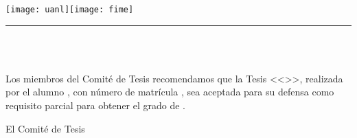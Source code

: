 {\renewcommand{\baselinestretch}{1.1}\selectfont
\begin{center}\vspace*{-25mm}\hspace*{-10mm}
\begin{minipage}{170.5mm}
\hspace{-1.5mm}\texttt{[image: uanl]}\hfill{}\hbox{\texttt{[image: fime]}}
\hrule\vspace{0.5mm}
\scalebox{.5}{\MakeUppercase{\uanl}}\hfill\scalebox{.5}{\MakeUppercase{\fime}}\medskip
\end{minipage}
\vskip4mm{\sc\large\uanl\\\fime\\[3pt]\depg}\vskip6mm
\end{center}

Los miembros del Comité de Tesis recomendamos que la Tesis <<\titulo>>, realizada por el alumno \autor, con número de matrícula \matricula, sea aceptada para su defensa como requisito parcial para obtener el grado de \grado\orientacion.
\ifdoctorado\vskip10mm\else\vskip8mm\fi

\begin{center}
El Comité de Tesis\\
\ifdoctorado\vskip15mm\else\vskip25mm\fi


\end{center}}
